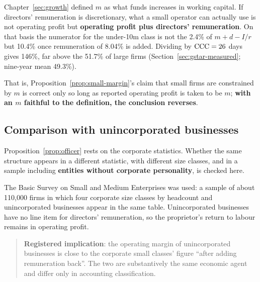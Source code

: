 \begin{remark}
Chapter~\ref{sec:growth} defined $m$ as what funds increases in working capital. If
directors' remuneration is discretionary, what a small operator can actually use is not
operating profit but \textbf{operating profit plus directors' remuneration}. On that basis
the numerator for the under-10m class is not the 2.4\% of $m+d-I/r$ but 10.4\% once
remuneration of 8.04\% is added. Dividing by $\mathrm{CCC}=26$ days gives 146\%, far above the 51.7\%
of large firms (Section~\ref{sec:gstar-measured}; nine-year mean 49.3\%).

That is, Proposition~\ref{prop:small-margin}'s claim that small firms are constrained by $m$
is correct only so long as reported operating profit is taken to be $m$;
\textbf{with an $m$ faithful to the definition, the conclusion reverses}.
\end{remark}

\subsection{Comparison with unincorporated businesses}
\label{sec:individual-firms}

Proposition~\ref{prop:officer} rests on the corporate statistics. Whether the same structure
appears in a different statistic, with different size classes, and in a sample including
\textbf{entities without corporate personality}, is checked here.

The Basic Survey on Small and Medium Enterprises was used: a sample of about 110{,}000 firms
in which four corporate size classes by headcount and unincorporated businesses appear in the
same table. Unincorporated businesses have no line item for directors' remuneration, so the
proprietor's return to labour remains in operating profit.

\begin{quote}
\textbf{Registered implication}: the operating margin of unincorporated businesses is close
to the corporate small classes' figure ``after adding remuneration back''. The two are
substantively the same economic agent and differ only in accounting classification.
\end{quote}

